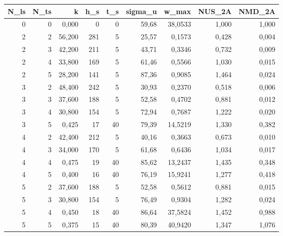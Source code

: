 \begin{tabular}{rrrrrrrrr}
\toprule
N_ls & N_ts & k & h_s & t_s & sigma_u & w_max & NUS_2A & NMD_2A \\ \hline
\midrule
0 & 0 & 0,000 & 0 & 0 & 59,68 & 38,0533 & 1,000 & 1,000 \\ \hline
2 & 2 & 56,200 & 281 & 5 & 25,57 & 0,1573 & 0,428 & 0,004 \\ \hline
2 & 3 & 42,200 & 211 & 5 & 43,71 & 0,3346 & 0,732 & 0,009 \\ \hline
2 & 4 & 33,800 & 169 & 5 & 61,46 & 0,5566 & 1,030 & 0,015 \\ \hline
2 & 5 & 28,200 & 141 & 5 & 87,36 & 0,9085 & 1,464 & 0,024 \\ \hline
3 & 2 & 48,400 & 242 & 5 & 30,93 & 0,2370 & 0,518 & 0,006 \\ \hline
3 & 3 & 37,600 & 188 & 5 & 52,58 & 0,4702 & 0,881 & 0,012 \\ \hline
3 & 4 & 30,800 & 154 & 5 & 72,94 & 0,7687 & 1,222 & 0,020 \\ \hline
3 & 5 & 0,425 & 17 & 40 & 79,39 & 14,5219 & 1,330 & 0,382 \\ \hline
4 & 2 & 42,400 & 212 & 5 & 40,16 & 0,3663 & 0,673 & 0,010 \\ \hline
4 & 3 & 34,000 & 170 & 5 & 61,68 & 0,6436 & 1,034 & 0,017 \\ \hline
4 & 4 & 0,475 & 19 & 40 & 85,62 & 13,2437 & 1,435 & 0,348 \\ \hline
4 & 5 & 0,400 & 16 & 40 & 76,19 & 15,9241 & 1,277 & 0,418 \\ \hline
5 & 2 & 37,600 & 188 & 5 & 52,58 & 0,5612 & 0,881 & 0,015 \\ \hline
5 & 3 & 30,800 & 154 & 5 & 76,49 & 0,9304 & 1,282 & 0,024 \\ \hline
5 & 4 & 0,450 & 18 & 40 & 86,64 & 37,5824 & 1,452 & 0,988 \\ \hline
5 & 5 & 0,375 & 15 & 40 & 80,39 & 40,9420 & 1,347 & 1,076 \\ \hline
\bottomrule
\end{tabular}
